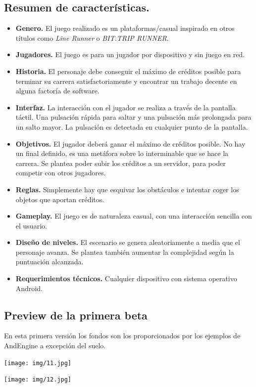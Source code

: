 \documentclass[12 pt, a4paper, twoside]{article}
\begin{document}
\clearpage
\subsection{Resumen de características.}
\begin{itemize}
  \item {\bf Genero.}
    El juego realizado es un plataformas/casual inspirado en otros
títulos como {\em Line Runner} o {\em BIT.TRIP RUNNER}.
  \item {\bf Jugadores.}
    El juego es para un jugador por dispositivo y sin juego en red.
  \item {\bf Historia.}
    El personaje debe conseguir el máximo de créditos posible para terminar su
    carrera satisfactoriamente y encontrar un trabajo decente en alguna
    factoría de software.
  \item {\bf Interfaz.}
    La interacción con el jugador se realiza a través de la pantalla
    táctil. Una pulsación rápida para saltar y una pulsación más
    prolongada para un salto mayor. La pulsación es detectada en
    cualquier punto de la pantalla.
  \item {\bf Objetivos.}
    El jugador deberá ganar el máximo de créditos posible. No hay un final
    definido, es una metáfora sobre lo interminable que se hace la carrera. Se
    plantea poder subir los créditos a un servidor, para poder competir con
    otros jugadores.
  \item {\bf Reglas.}
    Simplemente hay que esquivar los obstáculos e intentar coger los
    objetos que aportan créditos.
  \item {\bf Gameplay.}
    El juego es de naturaleza casual, con una interacción sencilla con el
    usuario.
  \item {\bf Diseño de niveles.}
    El escenario se genera aleatoriamente a media que el personaje avanza. Se
    plantea también aumentar la complejidad según la puntuación alcanzada.
  \item {\bf Requerimientos técnicos.}
    Cualquier dispositivo con sistema operativo Android.
\end{itemize}

\subsection{Preview de la primera beta}
En esta primera versión los fondos son los proporcionados por los
ejemplos de AndEngine a excepción del suelo.
\begin{center}
  \texttt{[image: img/11.jpg]}

  \texttt{[image: img/12.jpg]}
\end{center}
\end{document}
